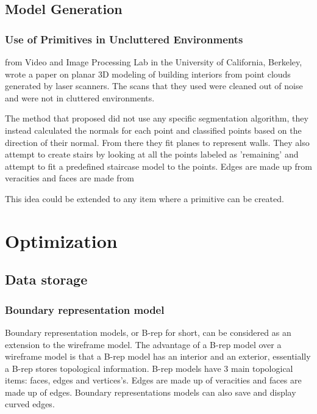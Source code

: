 	
	\subsection{Model Generation}
		\subsubsection{Use of Primitives in Uncluttered Environments}
			\cite{sanchez_planar_2012} from Video and Image Processing Lab in the University of California, Berkeley, wrote a paper on planar 3D modeling of building interiors from point clouds generated by laser scanners. The scans that they used were cleaned out of noise and were not in cluttered environments.
				
			The method that \citeauthor{sanchez_planar_2012} proposed did not use any specific segmentation algorithm, they instead calculated the normals for each point and classified points based on the direction of their normal. From there they fit planes to represent walls. They also attempt to create stairs by looking at all the points labeled as 'remaining' and attempt to fit a predefined staircase model to the points. Edges are made up from veracities and faces are made from 
				
			This idea could be extended to any item where a primitive can be created. 


	
\section{Optimization}
	\subsection{Data storage}
	
		\subsubsection{Boundary representation model}
			Boundary representation models, or B-rep for short, can be considered as an extension to the wireframe model. The advantage of a B-rep model over a wireframe model is that a B-rep model has an interior and an exterior, essentially a B-rep stores topological information. B-rep models have 3 main topological items: faces, edges and vertices's. Edges are made up of veracities and faces are made up of edges. Boundary representations models can also save and display curved edges. 
			
